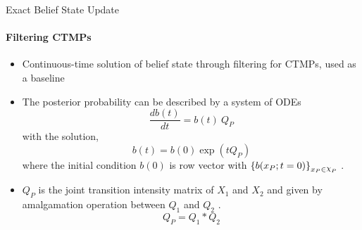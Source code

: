 \documentclass[
english,%
aspectratio=169,%
color={accentcolor=3b},
logo=true,%
colorframetitle=false,%
]{tudabeamer}
\DeclareRobustCommand{\rchi}{{\mathpalette\irchi\relax}}
\newcommand{\irchi}[2]{\raisebox{\depth}{$#1\chi$}}
\begin{document}
\begin{frame}{Exact Belief State Update}
\framesubtitle{Filtering CTMPs}
\begin{itemize}
\item Continuous-time solution of belief state through filtering for CTMPs, used as a baseline
\item The posterior probability can be described by a system of ODEs
\begin{equation}
\frac{db(t)}{dt} = b(t)\ Q_P
\end{equation}
with the solution,
\begin{equation}
b(t) = b(0) \exp(tQ_P)
\end{equation}
where the initial condition $ b(0) $ is row vector with $ \left\lbrace b(x_P;t=0)\right\rbrace_{x_P \in \rchi_P} $ \cite{huang_pauleve_zechner_unger_hansen_koeppl_2016}.
\item $ Q_P $ is the joint transition intensity matrix of $ X_{1} $ and $ X_{2} $ and given by amalgamation operation between $ Q_{1} $ and  $ Q_{2} $ \cite{Nodelman1995}.
\begin{equation}
Q_P = Q_{1} * Q_{2}
\end{equation}
\end{itemize}
\end{frame}
\end{document}

